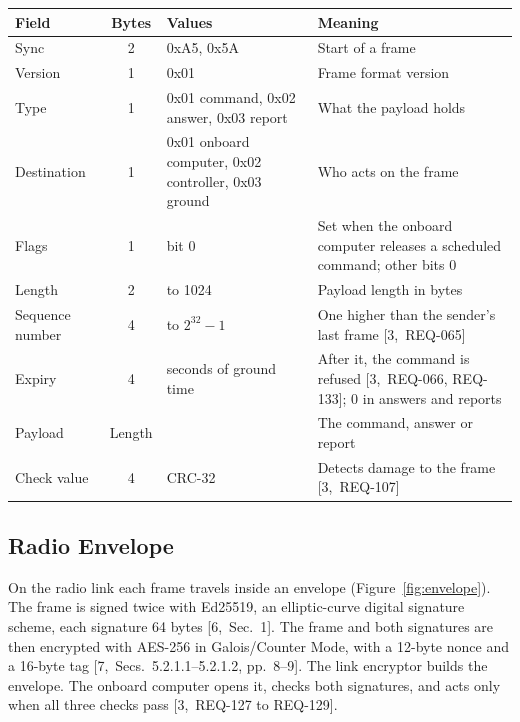 \documentclass[11pt,a4paper]{article}
\begin{document}
{\small\noindent\begin{tabularx}{\textwidth}{@{}lc>{\raggedright\arraybackslash}p{3.6cm}>{\raggedright\arraybackslash}X@{}}
\toprule
Field & Bytes & Values & Meaning \\
\midrule
Sync & 2 & 0xA5, 0x5A & Start of a frame \\
Version & 1 & 0x01 & Frame format version \\
Type & 1 & 0x01 command, 0x02 answer, 0x03 report & What the payload holds \\
Destination & 1 & 0x01 onboard computer, 0x02 controller, 0x03 ground & Who acts on the frame \\
Flags & 1 & bit 0 & Set when the onboard computer releases a scheduled command; other bits 0 \\
Length & 2 & 0 to 1024 & Payload length in bytes \\
Sequence number & 4 & 1 to $2^{32}-1$ & One higher than the sender's last frame [3,~REQ-065] \\
Expiry & 4 & seconds of ground time & After it, the command is refused [3,~REQ-066, REQ-133]; 0 in answers and reports \\
Payload & Length & & The command, answer or report \\
Check value & 4 & CRC-32 & Detects damage to the frame [3,~REQ-107] \\
\bottomrule
\end{tabularx}}

\subsection{Radio Envelope}
On the radio link each frame travels inside an envelope
(Figure~\ref{fig:envelope}). The frame is signed twice with Ed25519, an
elliptic-curve digital signature scheme, each signature 64 bytes
[6,~Sec.~1]. The frame and both signatures are then
encrypted with AES-256 in Galois/Counter Mode, with a 12-byte nonce and a
16-byte tag [7,~Secs.~5.2.1.1--5.2.1.2, pp.~8--9]. The link
encryptor builds the envelope. The onboard computer opens it, checks both
signatures, and acts only when all three checks pass [3,~REQ-127 to
REQ-129].
\end{document}
